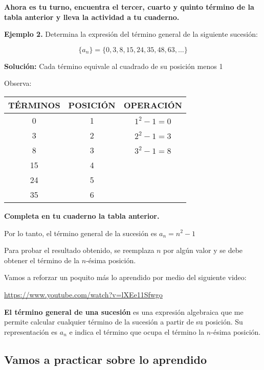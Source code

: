 \documentclass[12pt,a4paper]{article}
\begin{document}
\textbf{Ahora es tu turno, encuentra el tercer, cuarto y quinto término de la tabla anterior y lleva la actividad a tu cuaderno.}

\vspace{1cm}

\textbf{Ejemplo 2.} Determina la expresión del término general de la siguiente sucesión:

\[ \{a_n\} = \{0, 3, 8, 15, 24, 35, 48, 63, \ldots\} \]

\textbf{Solución:} Cada término equivale al cuadrado de su posición menos 1

Observa:

\begin{center}
\begin{tabular}{|c|c|c|}
\hline
\textbf{TÉRMINOS} & \textbf{POSICIÓN} & \textbf{OPERACIÓN} \\
\hline
0 & 1 & $1^2 - 1 = 0$ \\
\hline
3 & 2 & $2^2 - 1 = 3$ \\
\hline
8 & 3 & $3^2 - 1 = 8$ \\
\hline
15 & 4 & \\
\hline
24 & 5 & \\
\hline
35 & 6 & \\
\hline
\end{tabular}
\end{center}

\textbf{Completa en tu cuaderno la tabla anterior.}

Por lo tanto, el término general de la sucesión es $a_n = n^2 - 1$

Para probar el resultado obtenido, se reemplaza $n$ por algún valor y se debe obtener el término de la $n$-ésima posición.

Vamos a reforzar un poquito más lo aprendido por medio del siguiente video:

\url{https://www.youtube.com/watch?v=lXEe11Sfwgo}

\vspace{1cm}

\textbf{El término general de una sucesión} es una expresión algebraica que me permite calcular cualquier término de la sucesión a partir de su posición. Su representación es $a_n$ e indica el término que ocupa el término la $n$-ésima posición.

\subsection*{Vamos a practicar sobre lo aprendido}
\end{document}
